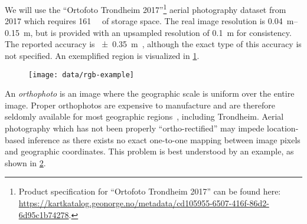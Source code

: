 We will use the \enquote{Ortofoto Trondheim 2017}\footnote{Product specification for \enquote{Ortofoto Trondheim 2017} can be found here:\\ \url{https://kartkatalog.geonorge.no/metadata/cd105955-6507-416f-86d2-6d95c1b74278}.} aerial photography dataset from 2017 which requires \SI{161}{\giga\byte} of storage space.
The real image resolution is \SIrange{0.04}{0.15}{\meter}, but is provided with an upsampled resolution of \SI{0.1}{\meter} for consistency.
The reported accuracy is \SI{\pm 0.35}{\meter}~\cite{trondheim_ortophoto_2017}, although the exact type of this accuracy is not specified.
An exemplified region is visualized in \cref{fig:rgb-example}.

\begin{figure}[hbt]
  \centering
  \texttt{[image: data/rgb-example]}
  \label{fig:rgb-example}
\end{figure}

An \textit{orthophoto} is an image where the geographic scale is uniform over the entire image.
Proper orthophotos are expensive to manufacture and are therefore seldomly available for most geographic regions~\cite{ortofoto_in_norway_2003}, including Trondheim.
Aerial photography which has not been properly \enquote{ortho-rectified} may impede location-based inference as there exists no exact one-to-one mapping between image pixels and geographic coordinates.
This problem is best understood by an example, as shown in \cref{fig:non-orthophoto-example}.

\begin{figure}[hbt]
  \centering
  \label{fig:non-orthophoto-example}
\end{figure}

